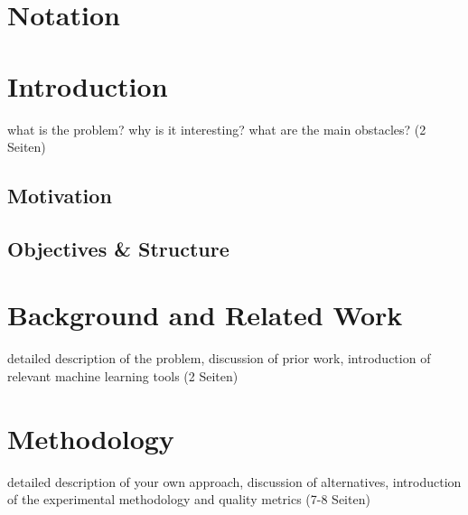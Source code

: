\documentclass[
     12pt,         %
     a4paper,      %
     DIV=14,        %
     ]{scrreprt}
\begin{document}
{\let\clearpage\relax\chapter*{Notation}}


\newpage

\tableofcontents
\cleardoublepage
{} 



\chapter{Introduction}
\label{chap:intro}
what is the problem? why is it interesting? what are the main obstacles? (2 Seiten)

\section{Motivation}


\section{Objectives \& Structure}
%

\newpage


\chapter{Background and Related Work}
\label{chap:background}

detailed description of the problem, discussion of prior work, introduction of relevant machine learning tools (2 Seiten)

\chapter{Methodology}
\label{chap:methodology}
detailed description of your own approach, discussion of alternatives, introduction of the experimental methodology and quality metrics (7-8 Seiten)
\end{document}
